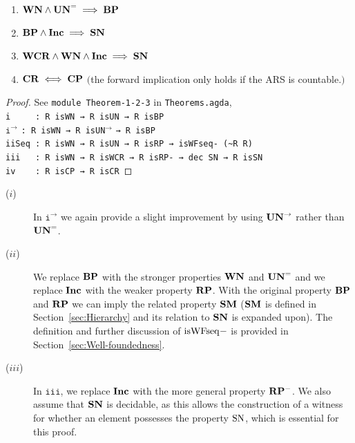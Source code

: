 \begin{theorem} \hfill
  \begin{enumerate}[label=\roman*.]
    \item $\mathbf{WN} \land \mathbf{UN}^{=} \implies \mathbf{BP}$
    \item $\mathbf{BP} \land \mathbf{Inc} \implies \mathbf{SN}$
    \item $\mathbf{WCR} \land \mathbf{WN} \land \mathbf{Inc} \implies \mathbf{SN}$
    \item $\mathbf{CR} \iff \mathbf{CP}$ $($the forward implication only holds if the ARS is countable.$)$
  \end{enumerate}
\end{theorem}

\begin{proof}
    See \texttt{module Theorem-1-2-3} in \texttt{Theorems.agda},\\
    \verb|i     : R isWN → R isUN → R isBP|\\
    $\mathtt{i^\to}$\hspace{5mm} \verb|: R isWN → R |\texttt{isUN}$^{\to}$ \verb|→ R isBP|\\
    \verb|iiSeq : R isWN → R isUN → R isRP → isWFseq- (~R R)|\\
    \verb|iii   : R isWN → R isWCR → R isRP- → dec SN → R isSN|\\
    \verb|iv    : R isCP → R isCR|
\end{proof}
\begin{remark} \hfill
  \begin{description}
    \item[($i$)] In $\mathtt{i^\to}$ we again provide a slight improvement by using $\mathbf{UN}^{\to}$ rather than $\mathbf{UN}^{=}$.
    \item[($ii$)] We replace $\mathbf{BP}$ with the stronger properties $\mathbf{WN}$ and $\mathbf{UN}^{=}$ and we replace $\mathbf{Inc}$ with the weaker property $\mathbf{RP}$. With the original property $\mathbf{BP}$ and $\mathbf{RP}$ we can imply the related property $\mathbf{SM}$ ($\mathbf{SM}$ is defined in Section~\ref{sec:Hierarchy} and its relation to $\mathbf{SN}$ is expanded upon). The definition and further discussion of $\mathrm{isWFseq}{-}$ is provided in Section~\ref{sec:Well-foundedness}.
    \item[($iii$)] In $\mathtt{iii}$, we replace $\mathbf{Inc}$ with the more general property $\mathbf{RP^{-}}$. We also assume that $\mathbf{SN}$ is decidable, as this allows the construction of a witness for whether an element possesses the property $\mathrm{SN}$, which is essential for this proof.
  \end{description}
\end{remark}
